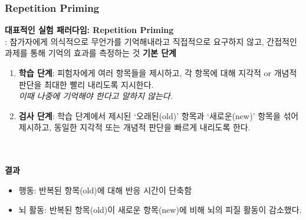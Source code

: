 \documentclass{beamer}
\begin{document}
\subsubsection{Repetition Priming}
\begin{frame}{\textbf{대표적인 실험 패러다임: Repetition Priming}\\\large : 참가자에게 의식적으로 무언가를 기억해내라고 직접적으로 요구하지 않고, 간접적인 과제를 통해 기억의 효과를 측정하는 것}
  \large
  \textbf{기본 단계}
  \vspace{-0.5em}
  \begin{enumerate}
    \item \textbf{학습 단계}: 피험자에게 여러 항목들을 제시하고, 각 항목에 대해 지각적 or 개념적 판단을 
    최대한 빨리 내리도록 지시한다.\\
    \textit{이때 나중에 기억해야 한다고 말하지 않는다.}
  \item \textbf{검사 단계}: 학습 단계에서 제시된 `오래된(old)' 항목과 `새로운(new)' 항목을 섞어 제시하고, 
    동일한 지각적 또는 개념적 판단을 빠르게 내리도록 한다.
  \end{enumerate}\\~\\

  \textbf{결과}
  \vspace{-0.5em}
  \begin{itemize}
    \item 행동: 반복된 항목(old)에 대해 반응 시간이 단축함
    \item 뇌 활동: 반복된 항목(old)이 새로운 항목(new)에 비해 뇌의 피질 활동이 감소했다.
  \end{itemize}

\end{frame}
\end{document}
